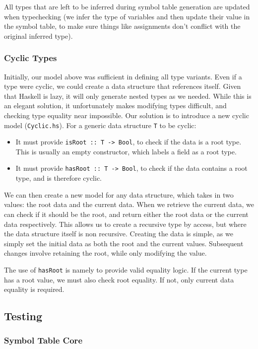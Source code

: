 \documentclass[11pt]{article}
\begin{document}
All types that are left to be inferred during symbol table generation
are updated when typechecking (we infer the type of variables and then
update their value in the symbol table, to make sure things like
assignments don't conflict with the original inferred type).
\subsubsection{Cyclic Types}

Initially, our model above was sufficient in defining all type
variants.  Even if a type were cyclic, we could create a data
structure that references itself.  Given that Haskell is lazy, it will
only generate nested types as we needed.  While this is an elegant
solution, it unfortunately makes modifying types difficult, and
checking type equality near impossible.  Our solution is to introduce
a new cyclic model (\texttt{Cyclic.hs}).  For a generic data structure
\texttt{T} to be cyclic:

\begin{itemize}
\item It must provide \texttt{isRoot :: T -> Bool}, to check if the
  data is a root type. This is usually an empty constructor, which
  labels a field as a root type.
\item It must provide \texttt{hasRoot :: T -> Bool}, to check if the
  data contains a root type, and is therefore cyclic.
\end{itemize}

We can then create a new model for any data structure, which takes in
two values: the root data and the current data.  When we retrieve the
current data, we can check if it should be the root, and return either
the root data or the current data respectively.  This allows us to
create a recursive type by access, but where the data structure itself
is non recursive.  Creating the data is simple, as we simply set the
initial data as both the root and the current values.  Subsequent
changes involve retaining the root, while only modifying the value.

The use of \texttt{hasRoot} is namely to provide valid equality logic.
If the current type has a root value, we must also check root
equality.  If not, only current data equality is required.

\subsection{Testing}
\subsubsection{Symbol Table Core}
\label{sec:test-symbol-table-core}
\end{document}
